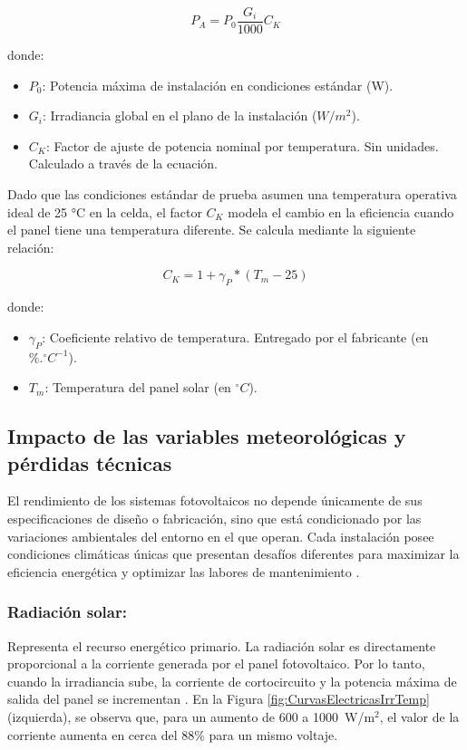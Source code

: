 \begin{equation}
    P_{A} = P_{0} \frac{G_{i}}{1000} C_{K}
\end{equation}

donde:
\begin{itemize}
    \item $P_{0}$: Potencia máxima de instalación en condiciones estándar (W).
    \item $G_{i}$: Irradiancia global en el plano de la instalación ($W/m^{2}$).
    \item $C_{K}$: Factor de ajuste de potencia nominal por temperatura. Sin unidades. Calculado a través de la ecuación.
\end{itemize}

Dado que las condiciones estándar de prueba asumen una temperatura operativa ideal de 25 °C en la celda, el factor $C_{K}$ modela el cambio en la eficiencia cuando el panel tiene una temperatura diferente. Se calcula mediante la siguiente relación:

\begin{equation}
    C_{K} = 1 + \gamma_{P} * (T_{m} - 25)
\end{equation}

donde:
\begin{itemize}
    \item $\gamma_{P}$: Coeficiente relativo de temperatura. Entregado por el fabricante (en $\%.^{\circ}C^{-1}$).
    \item $T_{m}$: Temperatura del panel solar (en $^{\circ}C$).
\end{itemize}


\subsection{Impacto de las variables meteorológicas y pérdidas técnicas}

El rendimiento de los sistemas fotovoltaicos no depende únicamente de sus especificaciones de diseño o fabricación, sino que está condicionado por las variaciones ambientales del entorno en el que operan. Cada instalación posee condiciones climáticas únicas que presentan desafíos diferentes para maximizar la eficiencia energética y optimizar las labores de mantenimiento \citep{chicaiza2024}.


\subsubsection{\textbf{Radiación solar:}} Representa el recurso energético primario. La radiación solar es directamente proporcional a la corriente generada por el panel fotovoltaico. Por lo tanto, cuando la irradiancia sube, la corriente de cortocircuito y la potencia máxima de salida del panel se incrementan \citep{Gonzalez2019Behavioral}. En la Figura \ref{fig:CurvasElectricasIrrTemp} (izquierda), se observa que, para un aumento de 600 a 1000~W/m$^{2}$, el valor de la corriente aumenta en cerca del 88\% para un mismo voltaje.
